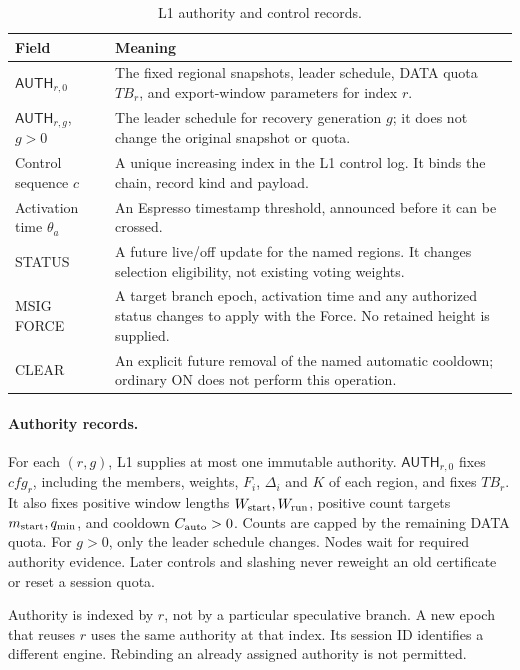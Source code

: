 \documentclass[11pt,a4paper]{article}
\newcommand{\TB}{\mathit{TB}}
\newcommand{\tagg}[1]{\ensuremath{\mathsf{#1}}}
\begin{document}
\begin{table}[htbp]\centering\small
\caption{L1 authority and control records.}\label{tab:l1}
\begin{tabularx}{\linewidth}{@{}p{.27\linewidth}Y@{}}\toprule
Field & Meaning\\\midrule
$\tagg{AUTH}_{r,0}$ & The fixed regional snapshots, leader schedule,
DATA quota $\TB_r$, and export-window parameters for index $r$.\\
$\tagg{AUTH}_{r,g}$, $g>0$ & The leader schedule for recovery
generation $g$; it does not change the original snapshot or quota.\\
Control sequence $c$ & A unique increasing index in the L1 control
log. It binds the chain, record kind and payload.\\
Activation time $\theta_a$ & An Espresso timestamp threshold,
announced before it can be crossed.\\
STATUS & A future live/off update for the named regions. It changes
selection eligibility, not existing voting weights.\\
MSIG FORCE & A target branch epoch, activation time and any authorized
status changes to apply with the Force. No retained height is supplied.\\
CLEAR & An explicit future removal of the named automatic cooldown;
ordinary ON does not perform this operation.\\\bottomrule
\end{tabularx}
\end{table}

\paragraph{Authority records.}
For each $(r,g)$, L1 supplies at most one immutable authority.
$\tagg{AUTH}_{r,0}$ fixes $\mathit{cfg}_r$, including the members,
weights, $F_i$, $\Delta_i$ and $K$ of each region, and fixes $\TB_r$.
It also fixes positive window lengths $W_{\rm start},W_{\rm run}$,
positive count targets $m_{\rm start},q_{\min}$, and cooldown
$C_{\rm auto}>0$. Counts are capped by the remaining DATA quota.
For $g>0$, only the leader schedule changes.
Nodes wait for required authority evidence. Later controls and slashing
never reweight an old certificate or reset a session quota.

Authority is indexed by $r$, not by a particular speculative branch.
A new epoch that reuses $r$ uses the same authority at that index.
Its session ID identifies a different engine. Rebinding an already
assigned authority is not permitted.
\end{document}

